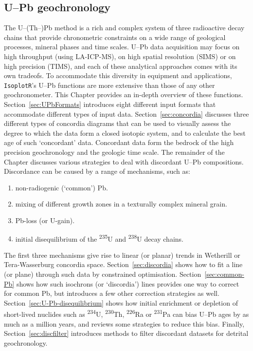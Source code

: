 \begin{refsection}
  
\chapter{U--Pb geochronology}\label{ch:U-Pb}

  The U--(Th--)Pb method is a rich and complex system of three
  radioactive decay chains that provide chronometric constraints on a
  wide range of geological processes, mineral phases and time scales.
  U--Pb data acquisition may focus on high throughput (using
  LA-ICP-MS), on high spatial resolution (SIMS) or on high precision
  (TIMS), and each of these analytical approaches comes with its own
  tradeofs. To accommodate this diversity in equipment and
  applications, \texttt{IsoplotR}'s U--Pb functions are more extensive
  than those of any other geochronometer. This Chapter provides an
  in-depth overview of these functions.\\

  Section~\ref{sec:UPbFormats} introduces eight different input
  formats that accommodate different types of input
  data. Section~\ref{sec:concordia} discusses three different types of
  concordia diagrams that can be used to visually assess the degree to
  which the data form a closed isotopic system, and to calculate the
  best age of such `concordant' data. Concordant data form the bedrock
  of the high precision geochronology and the geologic time scale.
  The remainder of the Chapter discusses various strategies to deal
  with discordant U--Pb compositions. Discordance can be caused by a
  range of mechanisms, such as:

  \begin{enumerate}
    \item non-radiogenic (`common') Pb.
    \item mixing of different growth zones in a texturally complex
      mineral grain.
    \item Pb-loss (or U-gain).
    \item initial disequilibrium of the \textsuperscript{235}U and
      \textsuperscript{238}U decay chains.
  \end{enumerate}

  The first three mechanisms give rise to linear (or planar) trends in
  Wetherill or Tera-Wasserburg concordia
  space. Section~\ref{sec:discordia} shows how to fit a line (or
  plane) through such data by constrained
  optimisation. Section~\ref{sec:common-Pb} shows how such isochrons
  (or `discordia') lines provides one way to correct for common Pb,
  but introduces a few other correction strategies as well.
  Section~\ref{sec:U-Pb-disequilibrium} shows how initial enrichment
  or depletion of short-lived nuclides such as \textsuperscript{234}U,
  \textsuperscript{230}Th, \textsuperscript{226}Ra or
  \textsuperscript{231}Pa can bias U--Pb ages by as much as a million
  years, and reviews some strategies to reduce this bias. Finally,
  Section~\ref{sec:discfilter} introduces methods to filter discordant
  datasets for detrital geochronology.


\end{refsection}
